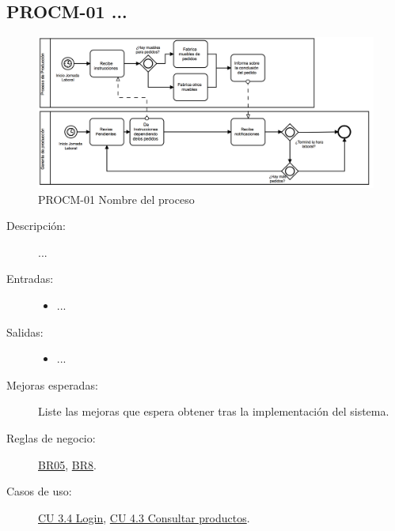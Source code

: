 \subsection{PROCM-01 ...}

\begin{figure}[htbp]
	\begin{center}
		\includegraphics[width=.8\textwidth]{images/proceso3}
		\caption{PROCM-01 Nombre del proceso}
		\label{fig:proceso3}
	\end{center}
\end{figure}

\begin{description}
	\item[Descripción:] ...
	\item[Entradas:] \cdtEmpty
        \begin{itemize}
			\item ...
        \end{itemize}
	\item[Salidas:] \cdtEmpty
        \begin{itemize}
			\item ...
        \end{itemize}	
    \item[Mejoras esperadas:] Liste las mejoras que espera obtener tras la implementación del sistema.
    \item[Reglas de negocio:] \hyperlink{BR05}{BR05}, \hyperlink{BR8}{BR8}.
    \item[Casos de uso:] \hyperlink{CU3.4}{CU 3.4 Login}, \hyperlink{CU 4.3}{ CU 4.3 Consultar productos}.
\end{description}
